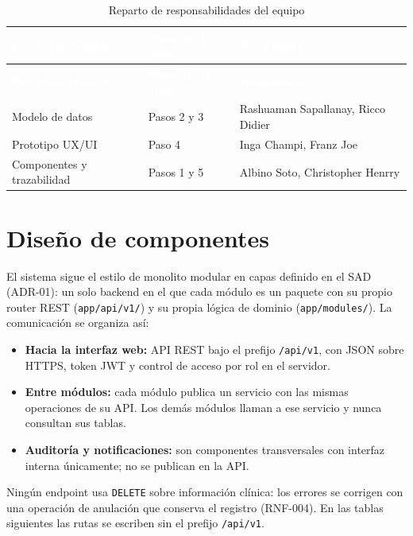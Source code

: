 \documentclass[11pt,a4paper]{article}
\newcommand{\cab}[1]{\textcolor{white}{\textbf{#1}}}
\begin{document}
\begin{xltabular}{\linewidth}{|P{4.5cm}|P{3.5cm}|L|}
  \caption{Reparto de responsabilidades del equipo}\label{tab:reparto}\\
  \hline
  \cab{Frente de trabajo} & \cab{Pasos de la guía} & \cab{Responsable} \\ \hline
  \endfirsthead
  \hline
  \cab{Frente de trabajo} & \cab{Pasos de la guía} & \cab{Responsable} \\ \hline
  \endhead
  Modelo de datos           & Pasos 2 y 3 & Rashuaman Sapallanay, Ricco Didier \\ \hline
  Prototipo UX/UI           & Paso 4      & Inga Champi, Franz Joe \\ \hline
  Componentes y trazabilidad & Pasos 1 y 5 & Albino Soto, Christopher Henrry \\ \hline
\end{xltabular}

\newpage
\section{Diseño de componentes}\label{sec:componentes}

El sistema sigue el estilo de monolito modular en capas definido en el SAD (ADR-01): un solo
backend en el que cada módulo es un paquete con su propio router REST (\nolinkurl{app/api/v1/})
y su propia lógica de dominio (\nolinkurl{app/modules/}). La comunicación se organiza así:

\begin{itemize}[nosep]
  \item \textbf{Hacia la interfaz web:} API REST bajo el prefijo \texttt{/api/v1}, con JSON sobre
        HTTPS, token JWT y control de acceso por rol en el servidor.
  \item \textbf{Entre módulos:} cada módulo publica un servicio con las mismas operaciones de su
        API. Los demás módulos llaman a ese servicio y nunca consultan sus tablas.
  \item \textbf{Auditoría y notificaciones:} son componentes transversales con interfaz interna
        únicamente; no se publican en la API.
\end{itemize}

Ningún endpoint usa \texttt{DELETE} sobre información clínica: los errores se corrigen con una
operación de anulación que conserva el registro (RNF-004). En las tablas siguientes las rutas
se escriben sin el prefijo \texttt{/api/v1}.
\end{document}
